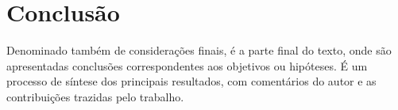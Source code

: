 
\chapter{Conclusão}

Denominado também de considerações finais, é a parte final do texto, onde são apresentadas conclusões correspondentes aos objetivos ou hipóteses. É um processo de síntese dos principais resultados, com comentários do autor e as contribuições trazidas pelo trabalho. 

